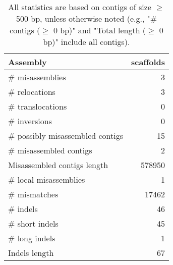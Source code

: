 \documentclass[12pt,a4paper]{article}
\begin{document}
\begin{table}[ht]
\begin{center}
\caption{All statistics are based on contigs of size $\geq$ 500 bp, unless otherwise noted (e.g., "\# contigs ($\geq$ 0 bp)" and "Total length ($\geq$ 0 bp)" include all contigs).}
\begin{tabular}{|l*{1}{|r}|}
\hline
Assembly & scaffolds \\ \hline
\# misassemblies & 3 \\ \hline
\hspace{5mm}\# relocations & 3 \\ \hline
\hspace{5mm}\# translocations & 0 \\ \hline
\hspace{5mm}\# inversions & 0 \\ \hline
\# possibly misassembled contigs & 15 \\ \hline
\# misassembled contigs & 2 \\ \hline
Misassembled contigs length & 578950 \\ \hline
\# local misassemblies & 1 \\ \hline
\# mismatches & 17462 \\ \hline
\# indels & 46 \\ \hline
\hspace{5mm}\# short indels & 45 \\ \hline
\hspace{5mm}\# long indels & 1 \\ \hline
Indels length & 67 \\ \hline
\end{tabular}
\end{center}
\end{table}
\end{document}
